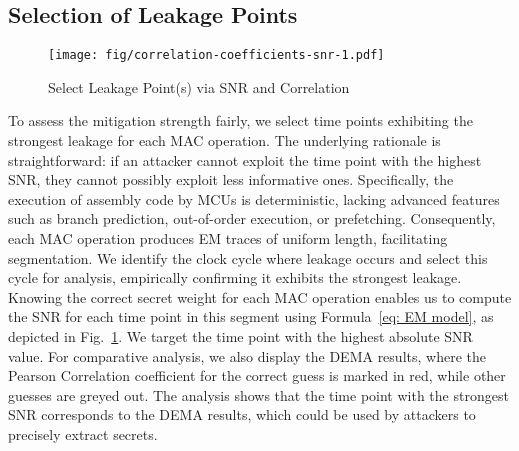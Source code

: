 \subsection{Selection of Leakage Points}
\begin{figure}[t]
    \centering
    \texttt{[image: fig/correlation-coefficients-snr-1.pdf]}
    \caption{Select Leakage Point(s) via SNR and Correlation}
    \label{fig: leakage points}
\end{figure}

To assess the mitigation strength fairly, we select time points exhibiting the strongest leakage for each MAC operation. 
The underlying rationale is straightforward: if an attacker cannot exploit the time point with the highest SNR, they cannot possibly exploit less informative ones. 
Specifically, the execution of assembly code by MCUs is deterministic, lacking advanced features such as branch prediction, out-of-order execution, or prefetching. 
Consequently, each MAC operation produces EM traces of uniform length, facilitating segmentation. We identify the clock cycle where leakage occurs and select this cycle for analysis, empirically confirming it exhibits the strongest leakage. 
Knowing the correct secret weight for each MAC operation enables us to compute the SNR for each time point in this segment using Formula~\eqref{eq: EM model}, as depicted in Fig.~\ref{fig: leakage points}. 
We target the time point with the highest absolute SNR value. 
For comparative analysis, we also display the DEMA results, where the Pearson Correlation coefficient for the correct guess is marked in {\color{red!60} red}, while other guesses are {\color{gray!50} greyed} out. 
The analysis shows that the time point with the strongest SNR corresponds to the DEMA results, which could be used by attackers to precisely extract secrets.



